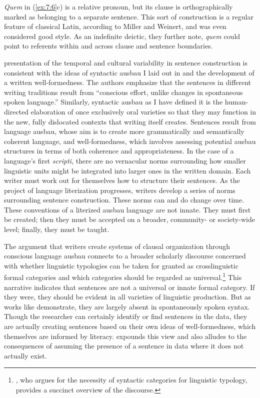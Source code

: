 \noindent \textit{Quem} in (\ref{ex:7:6}c) is a relative pronoun, but its clause is orthographically marked as belonging to a separate sentence. This sort of construction is a regular feature of classical Latin, according to Miller and Weinert, and was even considered good style. As an indefinite deictic, they further note, \textit{quem} could point to referents within and across clause and sentence boundaries.

 presentation of the temporal and cultural variability in sentence construction is consistent with the ideas of syntactic ausbau I laid out in  and the development of a written well-formedness. The authors emphasize that the sentences in different writing traditions result from “conscious effort, unlike changes in spontaneous spoken language.” Similarly, syntactic ausbau as I have defined it is the human-directed elaboration of once exclusively oral varieties so that they may function in the new, fully dislocated contexts that writing itself creates. Sentences result from language ausbau, whose aim is to create more grammatically and semantically coherent language, and well-formedness, which involves assessing potential ausbau structures in terms of both coherence and appropriateness. In the case of a language’s first \textit{scripti}, there are no vernacular norms surrounding how smaller linguistic units might be integrated into larger ones in the written domain. Each writer must work out for themselves how to structure their sentences. As the project of language literization progresses, writers develop a series of norms surrounding sentence construction. These norms can and do change over time. These conventions of a literized ausbau language are not innate. They must first be created; then they must be accepted on a broader, community- or society-wide level; finally, they must be taught.

The argument that writers create systems of clausal organization through conscious language ausbau connects to a broader scholarly discourse concerned with whether linguistic typologies can be taken for granted as crosslinguistic formal categories and which categories should be regarded as universal.\footnote{{\citet{Newmeyer2007}, who argues for the necessity of syntactic categories for linguistic typology, provides a succinct overview of the discourse.} } This narrative indicates that sentences are not a universal or innate formal category. If they were, they should be evident in all varieties of linguistic production. But as works like \citet{MillerWeinert1998} demonstrate, they are largely absent in spontaneously spoken syntax. Though the researcher can certainly identify or find sentences in the data, they are actually creating sentences based on their own ideas of well-formedness, which themselves are informed by literacy. \citet[180]{Mithun2005} expounds this view and also alludes to the consequences of assuming the presence of a sentence in data where it does not actually exist.

